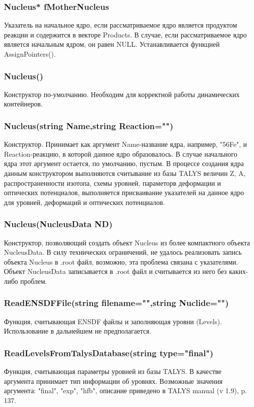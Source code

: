 \documentclass[a4paper,12pt]{extarticle}
\begin{document}
\subsubsection{Nucleus* fMotherNucleus}
Указатель на начальное ядро, если рассматриваемое ядро является продуктом реакции и содержится в векторе Products. В случае, если рассматриваемое ядро является начальным ядром, он равен NULL. Устанавливается функцией AssignPointers().
\subsubsection{Nucleus()}
Конструктор по-умолчанию. Необходим для корректной работы динамических контейнеров.
\subsubsection{Nucleus(string Name,string Reaction="")}
Конструктор. Принимает как аргумент Name-название ядра, например, "56Fe",  и Reaction-реакцию, в которой данное ядро образовалось. В случае начального ядра этот аргумент остается, по умолчанию, пустым. В процессе создания ядра данным конструктором выполняются считывание из базы TALYS величин Z, A, распространенности изотопа, схемы уровней, параметорв деформации и оптических потенциалов, выполняется присваивание указателей на данное ядро для уровней, деформаций и оптических потенциалов.
\subsubsection{Nucleus(NucleusData ND)}
Конструктор, позволяющий создать объект Nucleus из более компактного объекта NucleusData. В силу технических ограничений, не удалось реализовать запись объекта Nucleus в .root файл, возможно, эта проблема связана с указателями. Объект NucleusData записывается в .root файл и считывается из него без каких-либо проблем.
\subsubsection{ReadENSDFFile(string filename="",string Nuclide="")}
Функция, считывающая ENSDF файлы и заполняющая уровни (Levels). Использование в дальнейшем не предполагается.
\subsubsection{ReadLevelsFromTalysDatabase(string type="final")}
Функция, считывающая параметры уровней из базы TALYS. В качестве аргумента принимает тип информации об уровнях. Возможные значения аргумента: "final", "exp", "hfb", описание приведено в TALYS manual (v 1.9), p. 137.
\end{document}
